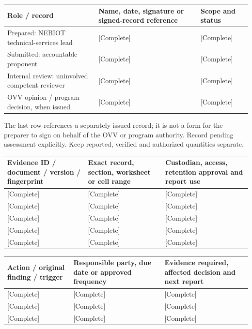 {\sffamily\fontsize{8.6}{10.7}\selectfont\begin{longtable}{@{}P{48mm}P{61mm}P{53mm}@{}}
\toprule
\textbf{Role / record} & \textbf{Name, date, signature or signed-record reference} & \textbf{Scope and status}\\\midrule\endhead
\rule{0pt}{8mm}Prepared: NEBIOT technical-services lead & [Complete] & [Complete]\\\hline
\rule{0pt}{8mm}Submitted: accountable proponent & [Complete] & [Complete]\\\hline
\rule{0pt}{8mm}Internal review: uninvolved competent reviewer & [Complete] & [Complete]\\\hline
\rule{0pt}{8mm}OVV opinion / program decision, when issued & [Complete] & [Complete]\\\hline
\end{longtable}}
The last row references a separately issued record; it is not a form for the preparer to sign on behalf of the OVV or program authority. Record pending assessment explicitly. Keep reported, verified and authorized quantities separate.\par
{}
{\sffamily\fontsize{8.6}{10.7}\selectfont\begin{longtable}{@{}P{48mm}P{61mm}P{53mm}@{}}
\toprule
\textbf{Evidence ID / document / version / fingerprint} & \textbf{Exact record, section, worksheet or cell range} & \textbf{Custodian, access, retention approval and report use}\\\midrule\endhead
\rule{0pt}{8mm}[Complete] & [Complete] & [Complete]\\\hline
\rule{0pt}{8mm}[Complete] & [Complete] & [Complete]\\\hline
\rule{0pt}{8mm}[Complete] & [Complete] & [Complete]\\\hline
\rule{0pt}{8mm}[Complete] & [Complete] & [Complete]\\\hline
\rule{0pt}{8mm}[Complete] & [Complete] & [Complete]\\\hline
\end{longtable}}
{\sffamily\fontsize{8.6}{10.7}\selectfont\begin{longtable}{@{}P{48mm}P{61mm}P{53mm}@{}}
\toprule
\textbf{Action / original finding / trigger} & \textbf{Responsible party, due date or approved frequency} & \textbf{Evidence required, affected decision and next report}\\\midrule\endhead
\rule{0pt}{8mm}[Complete] & [Complete] & [Complete]\\\hline
\rule{0pt}{8mm}[Complete] & [Complete] & [Complete]\\\hline
\rule{0pt}{8mm}[Complete] & [Complete] & [Complete]\\\hline
\end{longtable}}
